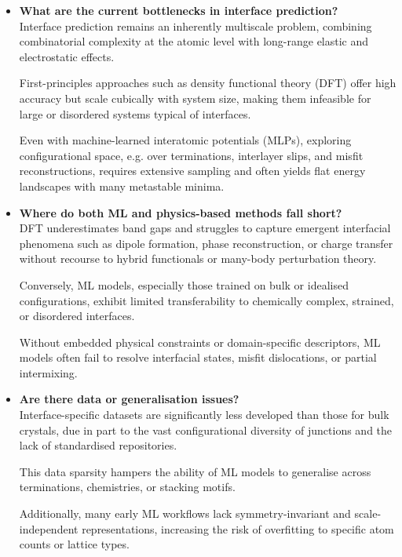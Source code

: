 \begin{itemize}
  \item \textbf{What are the current bottlenecks in interface prediction?} \\
  Interface prediction remains an inherently multiscale problem, combining combinatorial complexity at the atomic level
  with long-range elastic and electrostatic effects.

  First-principles approaches such as density functional theory (DFT) offer high accuracy but scale cubically with
  system size, making them infeasible for large or disordered systems typical of interfaces.

  Even with machine-learned interatomic potentials (MLPs), exploring configurational space, e.g. over terminations,
  interlayer slips, and misfit reconstructions, requires extensive sampling and often yields flat energy landscapes with
  many metastable minima.

  \item \textbf{Where do both ML and physics-based methods fall short?} \\
  DFT underestimates band gaps and struggles to capture emergent interfacial phenomena such as dipole formation, phase
  reconstruction, or charge transfer without recourse to hybrid functionals or many-body perturbation theory.

  Conversely, ML models, especially those trained on bulk or idealised configurations, exhibit limited transferability
  to chemically complex, strained, or disordered interfaces.

  Without embedded physical constraints or domain-specific descriptors, ML models often fail to resolve interfacial
  states, misfit dislocations, or partial intermixing.

  \item \textbf{Are there data or generalisation issues?} \\
  Interface-specific datasets are significantly less developed than those for bulk crystals, due in part to the vast
  configurational diversity of junctions and the lack of standardised repositories.

  This data sparsity hampers the ability of ML models to generalise across terminations, chemistries, or stacking
  motifs.

  Additionally, many early ML workflows lack symmetry-invariant and scale-independent representations, increasing the
  risk of overfitting to specific atom counts or lattice types.

\end{itemize}

